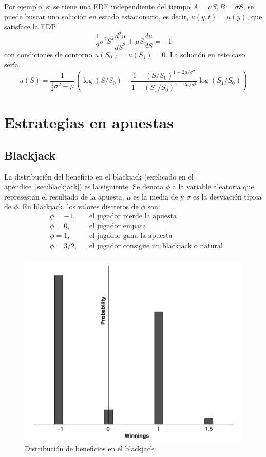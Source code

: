 Por ejemplo, si se tiene una EDE independiente del tiempo $A=\mu S, B=\sigma S$, se puede buscar una solución en estado estacionario, es decir, $u(y, t) = u(y)$, que satisface la EDP
\[
    \frac{1}{2}\sigma^2 S^2 \frac{d^2 u}{dS^2} + \mu S \frac{du}{dS} = -1
\]
con condiciones de contorno $u(S_0) = u(S_1) = 0$. La solución en este caso sería.
\[
    u(S) = \frac{1}{\frac{1}{2}\sigma^2 - \mu} \left( \log(S/S_0) - \frac{1 - (S/S_0)^{1-2\mu/\sigma^2}}{1 - (S_1/S_0)^{1-2\mu/\sigma^2}} \log(S_1/S_0) \right)
\]








\section{Estrategias en apuestas}

\subsection{Blackjack}
La distribución del beneficio en el blackjack (explicado en el apéndice~\ref{sec:blackjack}) es la siguiente. Se denota $\phi$ a la variable aleatoria que represestan el resultado de la apuesta, $\mu$ es la media de y $\sigma$ es la desviación típica de $\phi$. En blackjack, los valores discretos de $\phi$ son:
\begin{align*}
    &\phi = -1, && \text{el jugador pierde la apuesta} \\
    &\phi = 0, && \text{el jugador empata} \\
    &\phi = 1, && \text{el jugador gana la apuesta} \\
    &\phi = 3/2, && \text{el jugador consigue un blackjack o natural} \\
\end{align*}
\begin{figure}[H]
    \centering
    \includegraphics[width=0.65\linewidth]{Imagenes/Parte1/3_Aleatoriedad/blackjack_Dist.png}
    \caption{Distribución de beneficios en el blackjack}
\end{figure}




